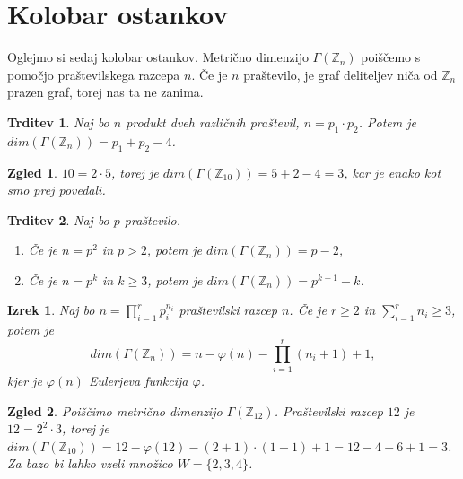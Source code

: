 \documentclass[a4paper,12pt]{article}
\def\Z{\mathbb{Z}} %
\newtheorem{izrek}{Izrek}
\newtheorem{trditev}{Trditev}
\newtheorem{zgled}{Zgled}
\begin{document}
\section{Kolobar ostankov}
Oglejmo si sedaj kolobar ostankov. Metrično dimenzijo $\Gamma(\Z_{n})$ poiščemo 
s pomočjo praštevilskega razcepa $n$. Če je $n$ praštevilo, je graf deliteljev 
niča od $\Z_{n}$ prazen graf, torej nas ta ne zanima.
%
\begin{trditev}
    Naj bo $n$ produkt dveh različnih praštevil, $n = p_1 \cdot p_2$. Potem je 
    $dim(\Gamma(\Z_{n})) = p_1 + p_2 - 4$.
\end{trditev}
%
\begin{zgled}
    $10 = 2\cdot5$, torej je $dim(\Gamma(\Z_{10})) = 5 + 2 - 4 = 3$, kar je enako kot 
    smo prej povedali.
\end{zgled}
%
\begin{trditev}
    Naj bo $p$ praštevilo.
    \begin{enumerate}
        \item Če je $n = p^2$ in $p > 2$, potem je $dim(\Gamma(\Z_{n})) = p - 2$,
        \item Če je $n = p^k$ in $k \geq 3$, potem je $dim(\Gamma(\Z_{n})) = p^{k-1} - k$.
    \end{enumerate}
\end{trditev}
%
\begin{izrek}
    Naj bo $n = \prod_{i = 1}^{r}p_i^{n_i}$ praštevilski razcep $n$. Če je $r \geq 2$ in 
    $\sum_{i=1}^{r}n_i \geq 3$, potem je 
    \begin{equation*}
        dim(\Gamma(\Z_{n})) = n - \varphi(n) - \prod_{i = 1}^{r}(n_i + 1) + 1,
    \end{equation*}
    kjer je $\varphi(n)$ Eulerjeva funkcija $\varphi$.
\end{izrek}
%
\begin{zgled}
    Poiščimo metrično dimenzijo $\Gamma(\Z_{12})$. Praštevilski razcep $12$ je 
    $12 = 2^2 \cdot 3$, torej je \\
    $dim(\Gamma(\Z_{10})) = 12 - \varphi(12) - (2 + 1)\cdot(1 + 1) + 1 = 12 - 4 - 6 + 1 = 3$.
    Za bazo bi lahko vzeli množico $W = \{2,3,4\}$.
\end{zgled}
%
%
\end{document}
